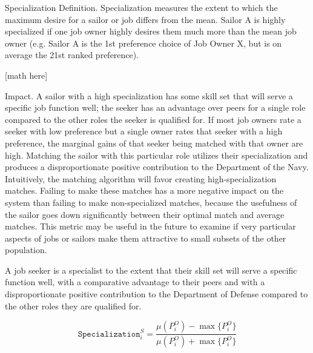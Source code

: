 Specialization
Definition. 
Specialization measures the extent to which the maximum desire for a sailor or job differs from the mean. Sailor A is highly specialized if one job owner highly desires them much more than the mean job owner (e.g. Sailor A is the 1st preference choice of Job Owner X, but is on average the 21st ranked preference).

[math here]

Impact. 
A sailor with a high specialization has some skill set that will serve a specific job function well; the seeker has an advantage over peers for a single role compared to the other roles the seeker is qualified for. If most job owners rate a seeker with low preference but a single owner rates that seeker with a high preference, the marginal gains of that seeker being matched with that owner are high. Matching the sailor with this particular role utilizes their specialization and produces a disproportionate positive contribution to the Department of the Navy. Intuitively, the matching algorithm will favor creating high-specialization matches. Failing to make these matches has a more negative impact on the system than failing to make non-specialized matches, because the usefulness of the sailor goes down significantly between their optimal match and average matches. This metric may be useful in the future to examine if very particular aspects of jobs or sailors make them attractive to small subsets of the other population.

A job seeker is a specialist to the extent that their skill set will serve a specific function well, with a comparative advantage to their peers and with a disproportionate positive contribution to the Department of Defense compared to the other roles they are qualified for.

\[\texttt{Specialization}^S_i = \frac{\mu(P^O_i) - \max\{P^O_i\}}{\mu(P^O_i) + \max\{P^O_i\}}\]